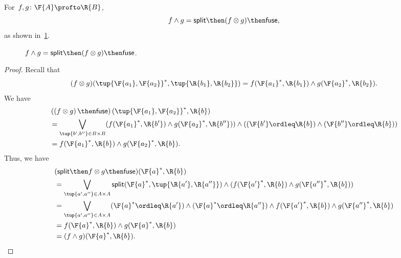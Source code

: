 \begin{lemma}
  \label{lemma:intersection}
  For~$f,g \colon \F{A} \profto \R{B}$,
  \begin{equation}
    f \wedge g = \mathsf{split} \then (f \otimes g) \then \mathsf{fuse},
  \end{equation}
  as shown in~\cref{fig:lemmasplitfuse}.
  \begin{figure}[h!]
    \begin{center}
    \end{center}
    \caption{$f \wedge g = \mathsf{split} \then (f \otimes g) \then \mathsf{fuse}$. \label{fig:lemmasplitfuse}}
  \end{figure}
\end{lemma}


\begin{proof}
  Recall that
  \begin{equation}
    (f\otimes g)(\tup{\F{a_1},\F{a_2}}^*,\tup{\R{b_1},\R{b_2}})=f(\F{a_1}^*,\R{b_1})\wedge g(\F{a_2}^*,\R{b_2}).
  \end{equation}
  We have
  \begin{equation}
    \begin{aligned}
      &\left(\left(f\otimes g\right) \then \mathsf{fuse}\right)(\tup{\F{a_1},\F{a_2}}^*,\R{b})\\
      &=\bigvee_{\tup{b',b''}\in B\times B}(f(\F{a_1}^*,\R{b'})\wedge g(\F{a_2}^*,\R{b''}))\wedge ((\F{b'}\ordleq \R{b}) \wedge (\F{b''}\ordleq \R{b}))\\
      &=f(\F{a_1}^*,\R{b})\wedge g(\F{a_2}^*,\R{b}).
    \end{aligned}
  \end{equation}
  Thus, we have
  \begin{equation}
    \begin{aligned}
      &(\mathsf{split}\then f\otimes g\then \mathsf{fuse})(\F{a}^*,\R{b})\\&=\bigvee_{\tup{a',a''}\in A\times A} \mathsf{split}(\F{a}^*,\tup{\R{a'},\R{a''}})\wedge (f(\F{a'}^*,\R{b})\wedge g(\F{a''}^*,\R{b}))\\
      &=\bigvee_{\tup{a',a''}\in A\times A}(\F{a}^*\ordleq \R{a'})\wedge (\F{a}^*\ordleq \R{a''})\wedge f(\F{a'}^*,\R{b})\wedge g(\F{a''}^*,\R{b})\\
      &=f(\F{a}^*,\R{b})\wedge g(\F{a}^*,\R{b})\\
      &=(f\wedge g)(\F{a}^*,\R{b}).
    \end{aligned}
  \end{equation}
\end{proof}
